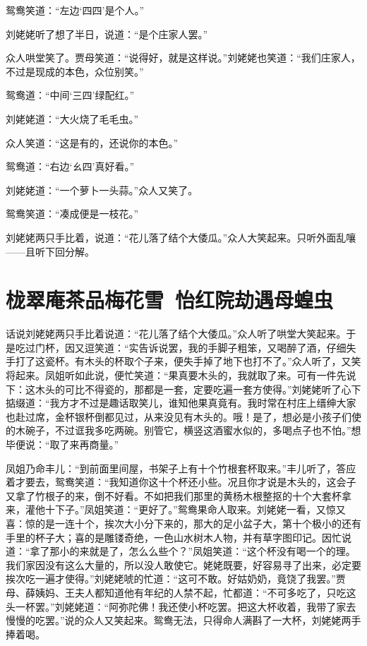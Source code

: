 \documentclass[12pt,oneside]{book}
\begin{document}
鸳鸯笑道：“左边‘四四’是个人。”

刘姥姥听了想了半日，说道：“是个庄家人罢。”

众人哄堂笑了。贾母笑道：“说得好，就是这样说。”刘姥姥也笑道：“我们庄家人，不过是现成的本色，众位别笑。”

鸳鸯道：“中间‘三四’绿配红。”

刘姥姥道：“大火烧了毛毛虫。”

众人笑道：“这是有的，还说你的本色。”

鸳鸯道：“右边‘ㄠ四’真好看。”

刘姥姥道：“一个萝卜一头蒜。”众人又笑了。

鸳鸯笑道：“凑成便是一枝花。”

刘姥姥两只手比着，说道：“花儿落了结个大倭瓜。”众人大笑起来。只听外面乱嚷——且听下回分解。

 
\chapter{栊翠庵茶品梅花雪~怡红院劫遇母蝗虫}
话说刘姥姥两只手比着说道：“花儿落了结个大倭瓜。”众人听了哄堂大笑起来。于是吃过门杯，因又逗笑道：“实告诉说罢，我的手脚子粗笨，又喝醉了酒，仔细失手打了这瓷杯。有木头的杯取个子来，便失手掉了地下也打不了。”众人听了，又笑将起来。凤姐听如此说，便忙笑道：“果真要木头的，我就取了来。可有一件先说下：这木头的可比不得瓷的，那都是一套，定要吃遍一套方使得。”刘姥姥听了心下掂缀道：“我方才不过是趣话取笑儿，谁知他果真竟有。我时常在村庄上缙绅大家也赴过席，金杯银杯倒都见过，从来没见有木头的。哦！是了，想必是小孩子们使的木碗子，不过诓我多吃两碗。别管它，横竖这酒蜜水似的，多喝点子也不怕。”想毕便说：“取了来再商量。”

凤姐乃命丰儿：“到前面里间屋，书架子上有十个竹根套杯取来。”丰儿听了，答应着才要去，鸳鸯笑道：“我知道你这十个杯还小些。况且你才说是木头的，这会子又拿了竹根子的来，倒不好看。不如把我们那里的黄杨木根整抠的十个大套杯拿来，灌他十下子。”凤姐笑道：“更好了。”鸳鸯果命人取来。刘姥姥一看，又惊又喜：惊的是一连十个，挨次大小分下来的，那大的足小盆子大，第十个极小的还有手里的杯子大；喜的是雕镂奇绝，一色山水树木人物，并有草字图印记。因忙说道：“拿了那小的来就是了，怎么么些个？”凤姐笑道：“这个杯没有喝一个的理。我们家因没有这么大量的，所以没人敢使它。姥姥既要，好容易寻了出来，必定要挨次吃一遍才使得。”刘姥姥唬的忙道：“这可不敢。好姑奶奶，竟饶了我罢。”贾母、薛姨妈、王夫人都知道他有年纪的人禁不起，忙都道：“不可多吃了，只吃这头一杯罢。”刘姥姥道：“阿弥陀佛！我还使小杯吃罢。把这大杯收着，我带了家去慢慢的吃罢。”说的众人又笑起来。鸳鸯无法，只得命人满斟了一大杯，刘姥姥两手捧着喝。
\end{document}
